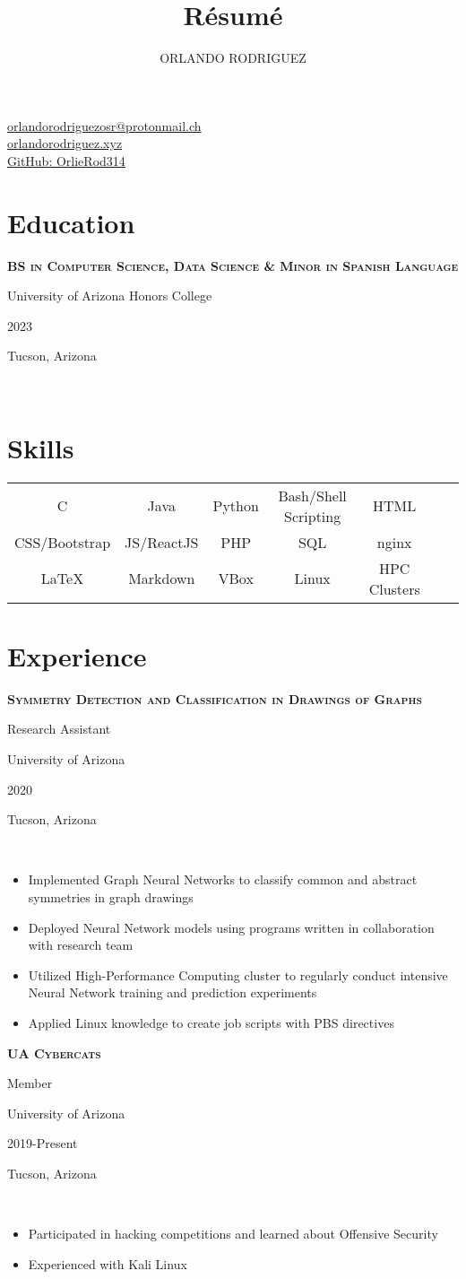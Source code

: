 \documentclass[letterpaper,10pt]{article}
\makeatletter
\newcommand{\entry}[5]{
    \hfill\vline\hfill
    \begin{minipage}[t]{.80\textwidth}
    
        \textbf{\textsc{#3}}
        
        #4
        
        \footnotesize{#1}
    \end{minipage}
    \hfill\vline\hfill
    \begin{minipage}[t]{.15\textwidth}
        #2
        
        \footnotesize{#5}
    \end{minipage}\\\vspace{.1cm}
}
\newcommand{\ua}{University of Arizona}
\newcommand{\uahc}{University of Arizona Honors College}
\newcommand{\town}{Tucson, Arizona}
\newcommand{\contact}{\href{mailto:orlandorodriguezosr@protonmail.ch}{orlandorodriguezosr@protonmail.ch}}
\newcommand{\site}{\href{https://www.orlandorodriguez.xyz}{orlandorodriguez.xyz}}
\newcommand{\git}{\href{https://www.github.com/OrlieRod314}{GitHub: OrlieRod314}}
\renewcommand{\maketitle}{
\begin{center}
{\LARGE
\theauthor}
\vspace{.1em}

\contact\\\site\\\git

\end{center}
}
\makeatother
\begin{document}
\title{R\'esum\'e}
\author{ORLANDO RODRIGUEZ}

\maketitle
\section{Education}
\entry{\uahc}{2023}{BS in Computer Science, Data Science \& Minor in Spanish Language}{}{\town}

\section{Skills}
\begin{center}
\setlength{\tabcolsep}{10pt} %
\renewcommand{\arraystretch}{1.5} %
\begin{tabular}{ccccccc}
 C & Java & Python & Bash/Shell Scripting &HTML \\
 CSS/Bootstrap & JS/ReactJS & PHP & SQL & nginx\\
{\LaTeX} & Markdown & VBox & Linux & HPC Clusters\\

\end{tabular}
\end{center}

\section{Experience}

\entry{\ua}{2020}{Symmetry Detection and Classification in Drawings of Graphs}{Research Assistant}{\town}
\begin{itemize}
   	\item Implemented Graph Neural Networks to classify common and abstract symmetries in graph drawings
    \item Deployed Neural Network models using programs written in collaboration with research team
    \item Utilized High-Performance Computing cluster to regularly conduct intensive Neural Network training and prediction experiments
	\item Applied Linux knowledge to create job scripts with PBS directives
\end{itemize}

\entry{\ua}{2019-Present}{UA Cybercats}{Member}{\town}
\begin{itemize}
    \item Participated in hacking competitions and learned about Offensive Security
	\item Experienced with Kali Linux
\end{itemize}
\end{document}
